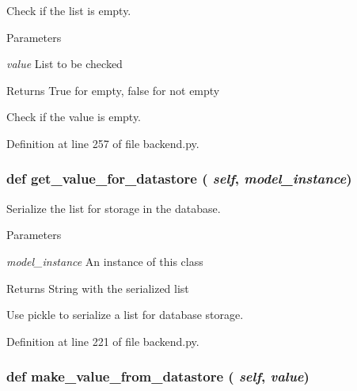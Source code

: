 Check if the list is empty. 


\begin{DoxyParams}{Parameters}
\item[{\em value}]List to be checked \end{DoxyParams}
\begin{DoxyReturn}{Returns}
True for empty, false for not empty\begin{DoxyVerb}Check if the value is empty.\end{DoxyVerb}
 
\end{DoxyReturn}


Definition at line 257 of file backend.py.

\hypertarget{classbackend_1_1_generic_list_property_a54cc138e6df3ad55c38fa5db72327963}{
\subsubsection[{get\_\-value\_\-for\_\-datastore}]{\setlength{\rightskip}{0pt plus 5cm}def get\_\-value\_\-for\_\-datastore ( {\em self}, \/   {\em model\_\-instance})}}
\label{classbackend_1_1_generic_list_property_a54cc138e6df3ad55c38fa5db72327963}


Serialize the list for storage in the database. 


\begin{DoxyParams}{Parameters}
\item[{\em model\_\-instance}]An instance of this class \end{DoxyParams}
\begin{DoxyReturn}{Returns}
String with the serialized list\begin{DoxyVerb}Use pickle to serialize a list for database storage.\end{DoxyVerb}
 
\end{DoxyReturn}


Definition at line 221 of file backend.py.

\hypertarget{classbackend_1_1_generic_list_property_a464c5a5f52df989128b5fc067ea34512}{
\subsubsection[{make\_\-value\_\-from\_\-datastore}]{\setlength{\rightskip}{0pt plus 5cm}def make\_\-value\_\-from\_\-datastore ( {\em self}, \/   {\em value})}}
\label{classbackend_1_1_generic_list_property_a464c5a5f52df989128b5fc067ea34512}


